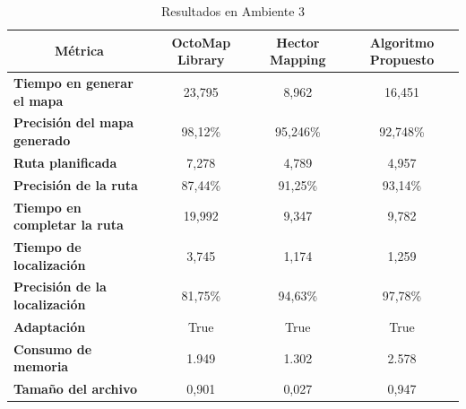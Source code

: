 \begin{table}[H]
\centering
\begin{tabular}{@{}lccc@{}}
\toprule
\multicolumn{1}{|c|}{\textbf{Métrica}} &
  \multicolumn{1}{c|}{\textbf{OctoMap Library}} &
  \multicolumn{1}{c|}{\textbf{Hector Mapping}} &
  \multicolumn{1}{c|}{\textbf{Algoritmo Propuesto}} \\ \midrule
\multicolumn{1}{|l|}{\textbf{Tiempo en generar el mapa}}    & \multicolumn{1}{c|}{23,795} & \multicolumn{1}{c|}{8,962} & \multicolumn{1}{c|}{16,451} \\ \midrule
\multicolumn{1}{|l|}{\textbf{Precisión del mapa generado}}  & \multicolumn{1}{c|}{98,12\%} & \multicolumn{1}{c|}{95,246\%} & \multicolumn{1}{c|}{92,748\%} \\ \midrule
\multicolumn{1}{|l|}{\textbf{Ruta planificada}}             & \multicolumn{1}{c|}{7,278} & \multicolumn{1}{c|}{4,789} & \multicolumn{1}{c|}{4,957} \\ \midrule
\multicolumn{1}{|l|}{\textbf{Precisión de la ruta}}         & \multicolumn{1}{c|}{87,44\%} & \multicolumn{1}{c|}{91,25\%} & \multicolumn{1}{c|}{93,14\%} \\ \midrule
\multicolumn{1}{|l|}{\textbf{Tiempo en completar la ruta}}  & \multicolumn{1}{c|}{19,992} & \multicolumn{1}{c|}{9,347} & \multicolumn{1}{c|}{9,782} \\ \midrule
\multicolumn{1}{|l|}{\textbf{Tiempo de localización}}       & \multicolumn{1}{c|}{3,745} & \multicolumn{1}{c|}{1,174} & \multicolumn{1}{c|}{1,259} \\ \midrule
\multicolumn{1}{|l|}{\textbf{Precisión de la localización}} & \multicolumn{1}{c|}{81,75\%} & \multicolumn{1}{c|}{94,63\%} & \multicolumn{1}{c|}{97,78\%} \\ \midrule
\multicolumn{1}{|l|}{\textbf{Adaptación}}                   & \multicolumn{1}{c|}{True} & \multicolumn{1}{c|}{True} & \multicolumn{1}{c|}{True} \\ \midrule
\multicolumn{1}{|l|}{\textbf{Consumo de memoria}}           & \multicolumn{1}{c|}{1.949} & \multicolumn{1}{c|}{1.302} & \multicolumn{1}{c|}{2.578} \\ \midrule
\multicolumn{1}{|l|}{\textbf{Tamaño del archivo}}           & \multicolumn{1}{c|}{0,901} & \multicolumn{1}{c|}{0,027} & \multicolumn{1}{c|}{0,947} \\ \bottomrule
\end{tabular}
\caption{Resultados en Ambiente 3}
\label{tab:resultados_ambiente_3}
\end{table}

